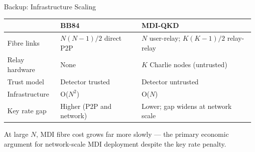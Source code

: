 \documentclass[10pt]{beamer}
\begin{document}
\begin{frame}{Backup: Infrastructure Scaling}
    \renewcommand{\arraystretch}{1.4}
    \scriptsize
    \begin{tabular}{lll}
        \toprule
        & \textbf{BB84} & \textbf{MDI-QKD} \\
        \midrule
        Fibre links     & $N(N-1)/2$ direct P2P     & $N$ user-relay; $K(K-1)/2$ relay-relay \\
        Relay hardware  & None                       & $K$ Charlie nodes (untrusted) \\
        Trust model     & Detector trusted           & Detector untrusted \\
        Infrastructure  & O($N^2$)                   & O($N$) \\
        \midrule
        Key rate gap    & Higher (P2P and network)   & Lower; gap widens at network scale \\
        \bottomrule
    \end{tabular}

    \vspace{0.3cm}
    \small At large $N$, MDI fibre cost grows far more slowly — the primary economic argument for
    network-scale MDI deployment despite the key rate penalty.
\end{frame}
\end{document}
